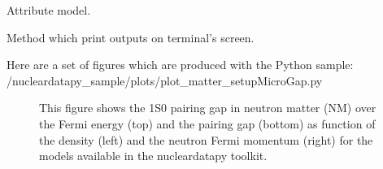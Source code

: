 \documentclass[letterpaper,10pt,english]{sphinxmanual}
\begin{document}
\begin{fulllineitems}
\begin{fulllineitems}
\end{fulllineitems}


\begin{fulllineitems}
\label{\detokenize{source/api/setup_matter_micro_gap:nucleardatapy.matter.setup_micro_gap.setupMicroGap.model}}
\pysigstartsignatures
{}
\pysigstopsignatures
\sphinxAtStartPar
Attribute model.

\end{fulllineitems}


\begin{fulllineitems}
\label{\detokenize{source/api/setup_matter_micro_gap:nucleardatapy.matter.setup_micro_gap.setupMicroGap.print_outputs}}
\pysigstartsignatures
{}
\pysigstopsignatures
\sphinxAtStartPar
Method which print outputs on terminal’s screen.

\end{fulllineitems}


\end{fulllineitems}


\sphinxAtStartPar
Here are a set of figures which are produced with the Python sample: /nucleardatapy\_sample/plots/plot\_matter\_setupMicroGap.py

\begin{figure}[htbp]
\centering
\capstart

\noindent{}
\caption{This figure shows the 1S0 pairing gap in neutron matter (NM) over the Fermi energy (top) and the pairing gap (bottom) as function of the density (left) and the neutron Fermi momentum (right) for the models available in the nucleardatapy toolkit.}\label{\detokenize{source/api/setup_matter_micro_gap:id1}}\end{figure}

\sphinxstepscope
\end{document}
